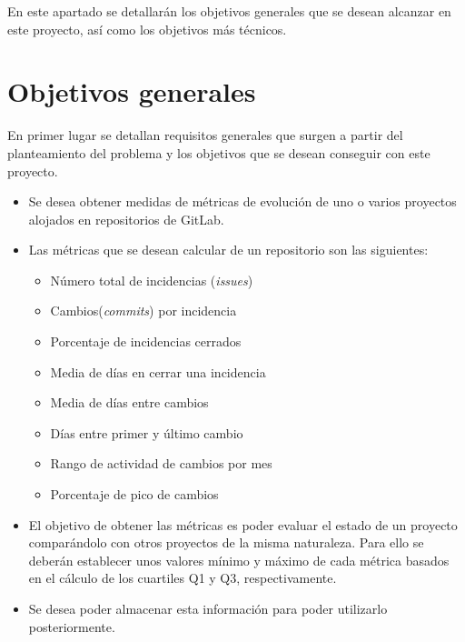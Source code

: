 
En este apartado se detallarán los objetivos generales que se desean alcanzar en este proyecto, así como los objetivos más técnicos.

\section{Objetivos generales}
En primer lugar se detallan requisitos generales que surgen a partir del planteamiento del problema y los objetivos que se desean conseguir con este proyecto.
\begin{itemize}
	\item Se desea obtener medidas de métricas de evolución de uno o varios proyectos alojados en repositorios de GitLab.
	\item Las métricas que se desean calcular de un repositorio son las siguientes:
	\begin{itemize}
		\tightlist
		\item Número total de incidencias (\textit{issues})
		\item Cambios(\textit{commits}) por incidencia
		\item Porcentaje de incidencias cerrados
		\item Media de días en cerrar una incidencia
		\item Media de días entre cambios
		\item Días entre primer y último cambio
		\item Rango de actividad de cambios por mes
		\item Porcentaje de pico de cambios
	\end{itemize}
	\item El objetivo de obtener las métricas es poder evaluar el estado de un proyecto comparándolo con otros proyectos de la misma naturaleza. Para ello se deberán establecer unos valores mínimo y máximo de cada métrica basados en el cálculo de los cuartiles Q1 y Q3, respectivamente.
	\item Se desea poder almacenar esta información para poder utilizarlo posteriormente.
\end{itemize}
